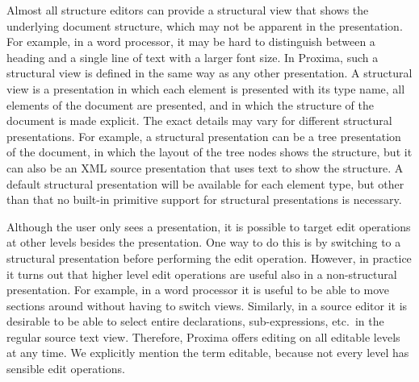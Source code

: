 Almost all structure editors can provide a structural view that shows the underlying document structure, which may not be apparent in the presentation. For example, in a word processor, it may be hard to distinguish between a heading and a single line of text with a larger font size. In Proxima, such a structural view is defined in the same way as any other presentation. A structural view is a presentation in which each element is presented with its type name, all elements of the document are presented, and in which the structure of the document is made explicit. The exact details may vary for different structural presentations. For example, a structural presentation can be a tree presentation of the document, in which the layout of the tree nodes shows the structure, but it can also be an XML source presentation that uses text to show the structure. A default structural presentation will be available for each element type, but other than that no built-in primitive support for structural presentations is necessary.

Although the user only sees a presentation, it is possible to target edit operations at other levels besides the presentation. One way to do this is by switching to a structural presentation before performing the edit operation. However, in practice it turns out that higher level edit operations are useful also in a non-structural presentation. For example, in a word processor it is useful to be able to move sections around without having to switch views. Similarly, in a source editor it is desirable to be able to select entire declarations, sub-expressions, etc.\ in the regular source text view. Therefore, Proxima offers editing on all editable levels at any time. We explicitly mention the term editable, because not every level has sensible edit operations. 







